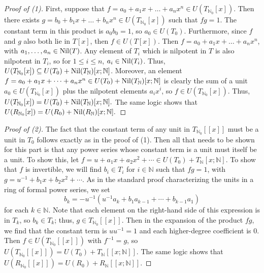 \documentclass[12pt]{amsart}
\theoremstyle{definition}
\newcommand{\bN}{\mathbb N}
\newcommand{\bNo}{{{\mathbb N}_0}}
\newcommand{\quot}[2]{\large\sfrac{#1}{#2}\normalsize}
\newcommand{\Nil}{\textup{Nil}}
\begin{document}
\begin{proof}[Proof of (1)]
    First, suppose that $f=a_0+a_1x+\dots+a_nx^n\in U(T_{\bNo}[x])$. Then there exists $g=b_0+b_1x+\dots+b_nx^n\in U(T_{\bNo}[x])$ such that $fg=1$. The constant term in this product is $a_0b_0=1$, so $a_0\in U(T_0)$. Furthermore, since $f$ and $g$ also both lie in $T[x]$, then $f\in U(T[x])$. Then $f=a_0+a_1x+\dots+a_nx^n$, with $a_1,\dots,a_n\in \Nil(T)$. Any element of $T_i$ which is nilpotent in $T$ is also nilpotent in $T_i$, so for $1\leq i\leq n$, $a_i\in \Nil(T_i)$. Thus, $U(T_\bNo[x])\subseteq U(T_0)+\Nil(T_\bN)[x;\bN]$. Moreover, an element $f=a_0+a_1x+\dots+a_nx^n\in U(T_0)+\Nil(T_\bN)[x;\bN]$ is clearly the sum of a unit $a_0\in U(T_{\bNo}[x])$ plus the nilpotent elements $a_ix^i$, so $f\in U(T_\bNo[x])$. Thus, $U(T_{\bNo}[x])=U(T_0)+\Nil(T_{\bN})[x;\bN].$ The same logic shows that $U(R_{\bNo}[x])=U(R_0)+\Nil(R_{\bN})[x;\bN].$
\end{proof}

\begin{proof}[Proof of (2)]
    The fact that the constant term of any unit in $T_{\bNo}[[x]]$ must be a unit in $T_0$ follows exactly as in the proof of (1). Then all that needs to be shown for this part is that any power series whose constant term is a unit must itself be a unit. To show this, let $f=u+a_1x+a_2x^2+\cdots\in U(T_0)+T_\bN[x;\bN]$. To show that $f$ is invertible, we will find $b_i\in T_i$ for $i\in\bN$ such that $fg=1$, with $g=u^{-1}+b_1x+b_2x^2+\cdots$. As in the standard proof characterizing the units in a ring of formal power series, we set
    $$b_k=-u^{-1}(u^{-1}a_k+b_1a_{k-1}+\cdots+b_{k-1}a_1)$$
    for each $k\in\bN$. Note that each element on the right-hand side of this expression is in $T_k$, so $b_k\in T_k$; thus, $g\in T_\bNo[[x]]$. Then in the expansion of the product $fg$, we find that the constant term is $uu^{-1}=1$ and each higher-degree coefficient is 0. Then $f\in U(T_{\bNo}[[x]])$ with $f^{-1}=g$, so $U(T_{\bNo}[[x]])=U(T_0)+T_{\bN}[[x;\bN]]$. The same logic shows that $U(R_{\bNo}[[x]])=U(R_0)+R_{\bN}[[x;\bN]].$
\end{proof}
\end{document}
